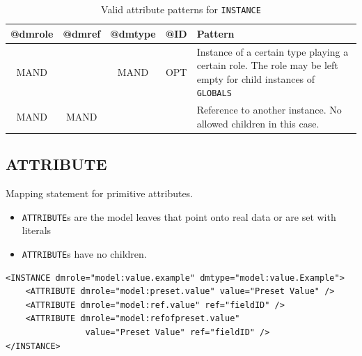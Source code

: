 \documentclass[11pt,a4paper]{ivoa}
\begin{document}
\begin{table}[hbtp]
\small
\centering
\begin{tabulary}{\linewidth}{|c|c|c|c|J|}
    \hline 
        \textbf{@dmrole} & 
        \textbf{@dmref} &  
        \textbf{@dmtype} &  
        \textbf{@ID} &  
        \textbf{Pattern}\\
    \hline      \hline  
        MAND &   
       & 
       MAND & 
       OPT & 
       Instance of a certain type playing a certain role. 
         \newline The role may be left empty  for child instances of 
          \texttt{GLOBALS} \\
    \hline  
       MAND  & 
       MAND  &  
       &  
       & 
       Reference to another instance. 
        \newline  No allowed children in this case.  \\

\hline 
\end{tabulary}
     \caption{Valid attribute patterns for  \texttt{INSTANCE}} 
     \label{tbl:inst-pattern}
 \end{table}

%
%
\clearpage
\subsection{ATTRIBUTE}

Mapping statement for primitive attributes.

\begin{itemize}
    \item \texttt{ATTRIBUTE}s  are the model leaves that point onto real data or are set with literals
    \item \texttt{ATTRIBUTE}s have no children.
\end{itemize}

\begin{lstlisting}[caption={ATTRIBUTE examples},style=XML]
<INSTANCE dmrole="model:value.example" dmtype="model:value.Example">
    <ATTRIBUTE dmrole="model:preset.value" value="Preset Value" />    
    <ATTRIBUTE dmrole="model:ref.value" ref="fieldID" />    
    <ATTRIBUTE dmrole="model:refofpreset.value" 
                value="Preset Value" ref="fieldID" />
</INSTANCE>
\end{lstlisting}
\end{document}

